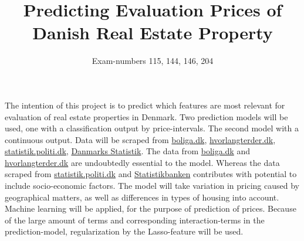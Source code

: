 \documentclass[12pt,a4paper]{article}
\begin{document}
\title{Predicting Evaluation Prices of Danish Real Estate Property} 
\author{Exam-numbers 115, 144, 146, 204}
\maketitle
\section*{}
The intention of this project is to predict which features are most relevant for evaluation of real estate properties in Denmark. Two prediction models will be used, one with a classification output by price-intervals. The second model with a continuous output. Data will be scraped from \href{https://www.boliga.dk}{boliga.dk}, \href{https://www.hvorlangterder.dk}{hvorlangterder.dk}, \href{https://statistik.politi.dk/QvAJAXZfc/opendoc.htm?document=QlikApplication%2F2999_Public\%2FPublic_IndsatsResultater.qvw}{statistik.politi.dk},
 \href{https://www.dst.dk/da/Statistik/emner/befolkning-og-valg}{Danmarks Statistik}.
The data from \href{https://www.boliga.dk}{boliga.dk} and \href{https://www.hvorlangterder.dk}{hvorlangterder.dk} are undoubtedly essential to the model. Whereas the data scraped from \href{https://statistik.politi.dk/QvAJAXZfc/opendoc.htm?document=QlikApplication%2F2999_Public\%2FPublic_IndsatsResultater.qvw}{statistik.politi.dk} 
and \href{https://statistikbanken.dk/statbank5a/default.asp?w=1280}{Statistikbanken} contributes with potential to include socio-economic factors.\newline
The model will take variation in pricing caused by geographical matters, as well as differences in types of housing into account.
Machine learning will be applied, for the purpose of prediction of prices. Because of the large amount of terms and corresponding interaction-terms in the prediction-model, regularization by the Lasso-feature will be used. 
\end{document}
